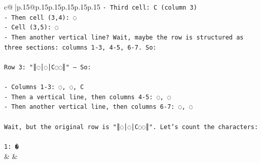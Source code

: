 \documentclass{article}
\begin{document}
{\begin{supertabular}{c@{$\;$}|p{.15\linewidth}@{}p{.15\linewidth}p{.15\linewidth}p{.15\linewidth}p{.15\linewidth}p{.15\linewidth}}
{{{\texttt{{-} Third cell: C (column 3)} \\
\texttt{{-} Then cell (3,4): ◌} \\
\texttt{{-} Cell (3,5): ◌} \\
\texttt{{-} Then another vertical line? Wait, maybe the row is structured as three sections: columns 1{-}3, 4{-}5, 6{-}7. So:} \\
\\ 
\texttt{Row 3: "║◌│◌│C◌◌║" — So:} \\
\\ 
\texttt{{-} Columns 1{-}3: ◌, ◌, C} \\
\texttt{{-} Then a vertical line, then columns 4{-}5: ◌, ◌} \\
\texttt{{-} Then another vertical line, then columns 6{-}7: ◌, ◌} \\
\\ 
\texttt{Wait, but the original row is "║◌│◌│C◌◌║". Let's count the characters:} \\
\\ 
\texttt{1: �} \\
            }
        }
    }
    & & \\ \\


\end{supertabular}}
\end{document}
